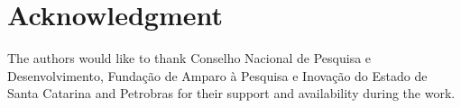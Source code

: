 \documentclass[journal]{IEEEtran}
\begin{document}
\section*{Acknowledgment}

The authors would like to thank Conselho Nacional de Pesquisa e Desenvolvimento, Fundação de Amparo à Pesquisa e Inovação do Estado de Santa Catarina and Petrobras for their support and availability during the work.


\ifCLASSOPTIONcaptionsoff
  \newpage
\fi



\end{document}
